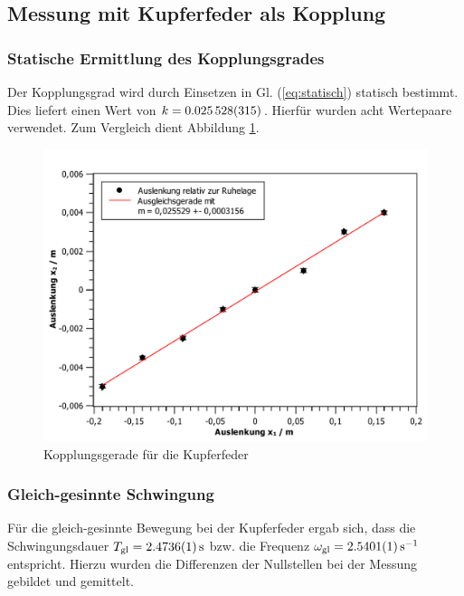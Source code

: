 \documentclass[11pt,a4paper,titlepage, ngerman]{article}
\newcommand{\refeq}[1]{Gl. (\ref{eq:#1})}
\begin{document}
		\subsection{Messung mit Kupferfeder als Kopplung}
			
			\subsubsection{Statische Ermittlung des Kopplungsgrades}							
				
				Der Kopplungsgrad wird durch Einsetzen in \refeq{statisch} statisch bestimmt. Dies liefert einen Wert von $k=\SI{0,025528 +- 0,000315}{}$. Hierfür wurden acht Wertepaare verwendet. Zum Vergleich dient Abbildung \ref{abb:CuKopp}.
				\begin{figure}[ht]
					\centering
					\includegraphics[width=\textwidth]{Kopplungsgerade-Cu.pdf}
					\caption{Kopplungsgerade für die Kupferfeder}
					\label{abb:CuKopp}	
				\end{figure}
			
			\subsubsection{Gleich-gesinnte Schwingung}
			
				Für die gleich-gesinnte Bewegung bei der Kupferfeder ergab sich, dass die Schwingungsdauer $T_\text{gl} = \SI{2,4736 +- 0,0001}{\second}$ bzw. die Frequenz $\omega_\text{gl}  = \SI{2,5401 +- 0,0001}{\s^{-1}}$ entspricht. Hierzu wurden die Differenzen der Nullstellen bei der Messung gebildet und gemittelt. 
			
\end{document}
